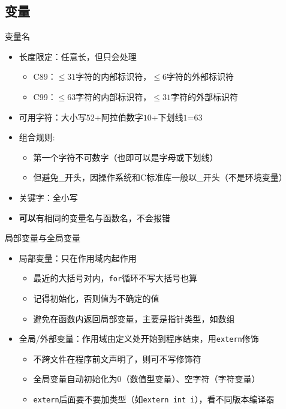 \documentclass{myslide}
\begin{document}
\subsection{变量}
\begin{frame}
\subsectionpage
\end{frame}

\begin{frame}{变量名}
\begin{itemize}
	\item<1-> 长度限定：任意长，但只会处理
	\begin{itemize}
		\item C89：$\leq 31$字符的内部标识符，$\leq 6$字符的外部标识符
		\item C99：$\leq 63$字符的内部标识符，$\leq 31$字符的外部标识符
	\end{itemize}
	\item<2-> 可用字符：大小写$52$+阿拉伯数字$10$+下划线$1$=$63$
	\item<2-> 组合规则:
	\begin{itemize}
		\item 第一个字符不可数字（也即可以是字母或下划线）
		\item 但避免\_开头，因操作系统和C标准库一般以\_开头（不是环境变量）
	\end{itemize}
	\item<3-> 关键字：全小写
	\item<3-> \textbf{可以}有相同的变量名与函数名，不会报错
\end{itemize}
\end{frame}

\begin{frame}[fragile]{局部变量与全局变量}
\begin{itemize}
	\item 局部变量：只在作用域内起作用
	\begin{itemize}[<+->]
		\item 最近的大括号对内，\verb'for'循环不写大括号也算
		\item 记得初始化，否则值为不确定的值
		\item 避免在函数内返回局部变量，主要是指针类型，如数组
	\end{itemize}
	\item 全局/外部变量：作用域由定义处开始到程序结束，用\verb'extern'修饰
	\begin{itemize}[<+->]
		\item 不跨文件在程序前文声明了，则可不写修饰符
		\item 全局变量自动初始化为0（数值型变量）、空字符（字符变量）
		\item \verb'extern'后面要不要加类型（如\verb'extern int i'），看不同版本编译器
	\end{itemize}
\end{itemize}
\end{frame}
\end{document}
